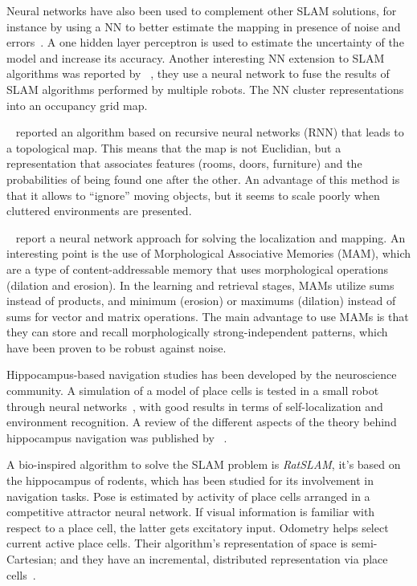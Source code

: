 Neural networks have also been used to complement other SLAM solutions, for instance by using a NN to better estimate the mapping in presence of noise and errors~\cite{choi2007neural}. A one hidden layer perceptron is used to estimate the uncertainty of the model and increase its accuracy. Another interesting NN extension to SLAM algorithms was reported by \citeauthor{saeedi2011neural}~\cite{saeedi2011neural}, they use a neural network to fuse the results of SLAM algorithms performed by multiple robots. The NN cluster representations into an occupancy grid map.

\citeauthor{forster2007rnn}~\cite{forster2007rnn} reported an algorithm based on recursive neural networks (RNN) that leads to a topological map. This means that the map is not Euclidian, but a representation that associates features (rooms, doors, furniture) and the probabilities of being found one after the other. 
An advantage of this method is that it allows to ``ignore'' moving objects, but it seems to scale poorly when cluttered environments are presented.

\citeauthor{villaverde2006morphological}~\cite{villaverde2006morphological} report a neural network approach for solving the localization and mapping. An interesting point is the use of Morphological Associative Memories (MAM), which are a type of content-addressable memory that uses morphological operations (dilation and erosion). In the learning and retrieval stages, MAMs utilize sums instead of products, and minimum (erosion) or maximums (dilation) instead of sums for vector and matrix operations. The main advantage to use MAMs is that they can store and recall morphologically strong-independent patterns, which have been proven to be robust against noise. 

Hippocampus-based navigation studies has been developed by the neuroscience community. A simulation of a model of place cells is tested in a small robot through neural networks~\cite{burgess1997robotic}, with good results in terms of self-localization and environment recognition. A review of the different aspects of the theory behind hippocampus navigation was published by \citeauthor{sunderhauf2010learning}~\cite{sunderhauf2010learning}. 

A bio-inspired algorithm to solve the SLAM problem is \emph{RatSLAM}, it's based on the hippocampus of rodents, which has been studied for its involvement in navigation tasks. Pose is estimated by activity of place cells arranged in a competitive attractor neural network. If visual information is familiar with respect to a place cell, the latter gets excitatory input. Odometry helps select current active place cells. Their algorithm's representation of space is semi-Cartesian; and they have an incremental, distributed representation via place cells~\cite{rat-slam,milford2008robot}.
